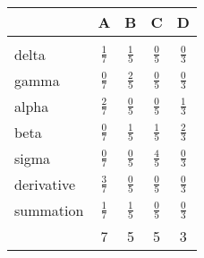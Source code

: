 \documentclass{article}
\begin{document}
\begin{center}
\begin{tabular}{l|| c c c c}
\hline\hline
& 	A&	B&	C&	D	\\
\hline\hline
\\
delta&		\(\frac{1}{7}\)&	\(\frac{1}{5}\)&	\(\frac{0}{5}\)&	\(\frac{0}{3}\)\\[1ex]
gamma&		\(\frac{0}{7}\)&	\(\frac{2}{5}\)&	\(\frac{0}{5}\)&	\(\frac{0}{3}\)\\[1ex]
alpha&		\(\frac{2}{7}\)& 	\(\frac{0}{5}\)&	\(\frac{0}{5}\)&	\(\frac{1}{3}\)\\[1ex]
beta&		\(\frac{0}{7}\)&	\(\frac{1}{5}\)&	\(\frac{1}{5}\)&	\(\frac{2}{3}\)\\[1ex]
sigma&		\(\frac{0}{7}\)&	\(\frac{0}{5}\)&	\(\frac{4}{5}\)&	\(\frac{0}{3}\)\\[1ex]
derivative& 	\(\frac{3}{7}\)&	\(\frac{0}{5}\)&	\(\frac{0}{5}\)&	\(\frac{0}{3}\)\\[1ex]
summation&	\(\frac{1}{7}\)&	\(\frac{1}{5}\)&	\(\frac{0}{5}\)&	\(\frac{0}{3}\)\\[1ex]
		&7	&5	&5	&3\\
\hline
\end{tabular}
\end{center}
\pagebreak
\tiny
\end{document}

